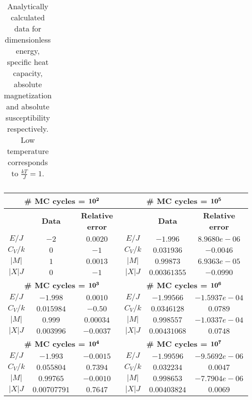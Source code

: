 \documentclass[12pt]{article}
\begin{document}
\begin{flushleft}
\begin{table}[!h]
\begin{center}
\begin{tabular}{| c | c |}
  \hline
\end{tabular}
\end{center}
\caption{\label{tab:analytic_low_T}Analytically calculated data for dimensionless energy, specific heat capacity, absolute magnetization and absolute susceptibility respectively. Low temperature corresponds to $\frac{kT}{J} = 1$.}
\end{table}


\begin{table}[!h]
\begin{center}
\begin{tabular}{| c | c | c || c | c | c |}
	\hline
   \multicolumn{3}{|c||}{	\textbf{\# MC cycles = $\bf 10^{2}$}} & \multicolumn{3}{|c|}{	\textbf{\# MC cycles = $\bf 10^{5}$}} \\
	\hline
	 & \textbf{Data} & \textbf{Relative error} & & \textbf{Data} & \textbf{Relative error}\\
	\hline	
	 $E/J$ & $-2$ & $0.0020$ & $E/J$ & $-1.996$ & $8.9680e-06$\\
	 $C_V/k$ & $0$ & $-1$ & 	 $C_V/k$ & $0.031936$ & $-0.0046$\\
	 $|M|$ & $1$ & $0.0013$ & 	 $|M|$ & $0.99873$ & $6.9363e-05$\\
	 $|X|J$ & $0$ & $-1$ & 	 $|X|J$ & $0.00361355$ & $-0.0990$\\

  \hline
  
  \hline
   \multicolumn{3}{|c||}{	\textbf{\# MC cycles = $\bf 10^{3}$}} & \multicolumn{3}{|c|}{	\textbf{\# MC cycles = $\bf 10^{6}$}} \\
	\hline	
	 $E/J$ & $-1.998$ & $0.0010$ & $E/J$ & $-1.99566$ & $-1.5937e-04$\\
	 $C_V/k$ & $0.015984$ & $-0.50$ & 	 $C_V/k$ & $0.0346128$ & $0.0789$\\
	 $|M|$ & $0.999$ & $0.00034$ & 	 $|M|$ & $0.998557$ & $-1.0337e-04$\\
	 $|X|J$ & $0.003996$ & $-0.0037$ & 	 $|X|J$ & $0.00431068$ & $0.0748$\\

  \hline
  
  \hline
   \multicolumn{3}{|c||}{	\textbf{\# MC cycles = $\bf 10^{4}$}} & \multicolumn{3}{|c|}{	\textbf{\# MC cycles = $\bf 10^{7}$}} \\
	\hline	
	 $E/J$ & $-1.993$ & $-0.0015$ & $E/J$ & $-1.99596$ & $-9.5692e-06$\\
	 $C_V/k$ & $0.055804$ & $0.7394$ & 	 $C_V/k$ & $0.032234$ & $0.0047$\\
	 $|M|$ & $0.99765$ & $-0.0010$ & 	 $|M|$ & $0.998653$ & $-7.7904e-06$\\
	 $|X|J$ & $0.00707791$ & $0.7647$ & 	 $|X|J$ & $0.00403824$ & $0.0069$\\


\end{tabular}
\end{center}
\end{table}
\end{flushleft}
\end{document}
